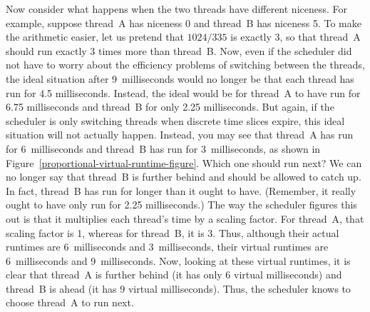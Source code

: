 Now consider what happens when the two threads have different niceness.  For
example, suppose thread~A has niceness 0 and thread~B has niceness 5.  To
make the arithmetic easier, let us pretend that $1024/335$ is exactly 3, so
that thread~A should run exactly 3 times more than thread~B.  Now, even if
the scheduler did not have to worry about the efficiency problems of
switching between the threads, the ideal situation after 9~milliseconds
would no longer be that each thread has run for 4.5 milliseconds.  Instead,
the ideal would be for thread~A to have run for 6.75 milliseconds and thread~B
for only 2.25 milliseconds.  But again, if the scheduler is only switching
threads when discrete time slices expire, this ideal situation will not actually
happen.  Instead, you may see that thread~A has run for 6~milliseconds and
thread~B has run for 3~milliseconds, as shown in Figure~\ref{proportional-virtual-runtime-figure}.  Which one should run next?  We can no
longer say that thread~B is further behind and should be allowed to catch
up.  In fact, thread~B has run for longer than it ought to have.  (Remember,
it really ought to have only run for 2.25 milliseconds.)  The way the
scheduler figures this out is that it multiplies each thread's time by a
scaling factor.  For thread~A, that scaling factor is 1, whereas for thread~B, it is 3.  Thus, although their actual runtimes are 6~milliseconds and
3~milliseconds, their virtual runtimes are 6~milliseconds and 9~milliseconds.  Now, looking at these virtual runtimes, it is clear that
thread~A  is further behind (it has only 6 virtual milliseconds) and
thread~B is ahead (it has 9 virtual milliseconds).  Thus, the
scheduler knows to choose thread~A to run next.
